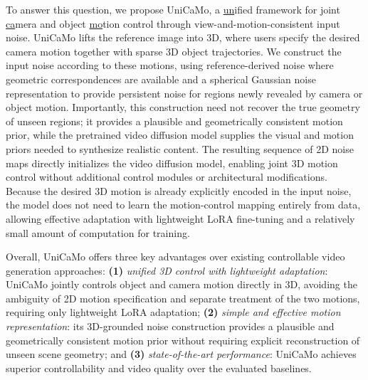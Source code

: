 \ifdefined\arxivbuild\else\documentclass{article}\fi %
\begin{document}

To answer this question, we propose UniCaMo, a \underline{un}ified framework for joint \underline{ca}mera and object \underline{mo}tion control through view-and-motion-consistent input noise. UniCaMo lifts the reference image into 3D, where users specify the desired camera motion together with sparse 3D object trajectories. We construct the input noise according to these motions, using reference-derived noise where geometric correspondences are available and a spherical Gaussian noise representation to provide persistent noise for regions newly revealed by camera or object motion. Importantly, this construction need not recover the true geometry of unseen regions; it provides a plausible and geometrically consistent motion prior, while the pretrained video diffusion model supplies the visual and motion priors needed to synthesize realistic content. The resulting sequence of 2D noise maps directly initializes the video diffusion model, enabling joint 3D motion control without additional control modules or architectural modifications. Because the desired 3D motion is already explicitly encoded in the input noise, the model does not need to learn the motion-control mapping entirely from data, allowing effective adaptation with lightweight LoRA fine-tuning and a relatively small amount of computation for training.

Overall, UniCaMo offers three key advantages over existing controllable video generation approaches: \textbf{(1)} \emph{unified 3D control with lightweight adaptation}: UniCaMo jointly controls object and camera motion directly in 3D, avoiding the ambiguity of 2D motion specification and separate treatment of the two motions, requiring only lightweight LoRA adaptation; \textbf{(2)} \emph{simple and effective motion representation}: its 3D-grounded noise construction provides a plausible and geometrically consistent motion prior without requiring explicit reconstruction of unseen scene geometry; and \textbf{(3)} \emph{state-of-the-art performance}: UniCaMo achieves superior controllability and video quality over the evaluated baselines.
\end{document}
